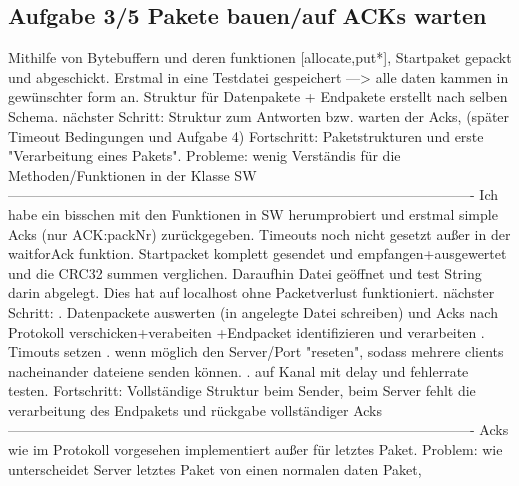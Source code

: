 \documentclass {article}[a4paper,12pt]
\begin{document}
\subsection{Aufgabe 3/5 Pakete bauen/auf ACKs warten}
Mithilfe von Bytebuffern und deren funktionen [allocate,put*], Startpaket gepackt und abgeschickt.
Erstmal in eine Testdatei gespeichert ---> alle daten kammen in gewünschter form an.
Struktur  für  Datenpakete + Endpakete erstellt nach selben Schema.
\newline
nächster Schritt:
Struktur zum Antworten bzw. warten der Acks, (später Timeout Bedingungen und  Aufgabe 4)
\newline
Fortschritt: Paketstrukturen und erste  "Verarbeitung  eines  Pakets".
\newline
Probleme: wenig Verständis für die Methoden/Funktionen in der Klasse SW
\newline
----------------------------------------------------------------------------------------------------
\newline
Ich habe ein bisschen mit den Funktionen in SW herumprobiert und
erstmal simple Acks (nur ACK:packNr) zurückgegeben.
Timeouts noch nicht gesetzt außer in der waitforAck funktion.
Startpacket komplett gesendet und empfangen+ausgewertet und die CRC32 summen verglichen.
Daraufhin Datei geöffnet und test String darin abgelegt. Dies hat  auf localhost ohne Packetverlust  funktioniert.
\newline
nächster Schritt: 
. Datenpackete auswerten (in angelegte Datei schreiben) und Acks nach Protokoll verschicken+verabeiten
   +Endpacket identifizieren und verarbeiten
. Timouts setzen
. wenn möglich den Server/Port "reseten", sodass mehrere clients nacheinander dateiene senden können.
. auf Kanal mit delay und fehlerrate testen.
\newline
Fortschritt: Vollständige Struktur beim Sender, beim Server fehlt die  verarbeitung des Endpakets  und rückgabe vollständiger Acks
\newline
----------------------------------------------------------------------------------------------------
\newline
Acks wie im Protokoll vorgesehen implementiert außer für letztes Paket.
\newline
Problem: wie unterscheidet Server  letztes Paket von einen normalen daten Paket,
\end{document}
